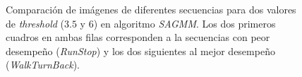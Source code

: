\begin{figure}[!ht]
\centering     %
{}
\caption[Comparación de cuadros con dos distintos valores de \textit{threshold} algoritmo \textit{SAGMM}.]{Comparación de imágenes de diferentes secuencias para dos valores de \textit{threshold} ($3.5$ y $6$) en algoritmo \textit{SAGMM}. Los dos primeros cuadros en ambas filas corresponden a la secuencias con peor desempeño (\textit{RunStop}) y los dos siguientes al mejor desempeño (\textit{WalkTurnBack}).}
\label{fig:frame_sagmm_threshold}
\end{figure}

